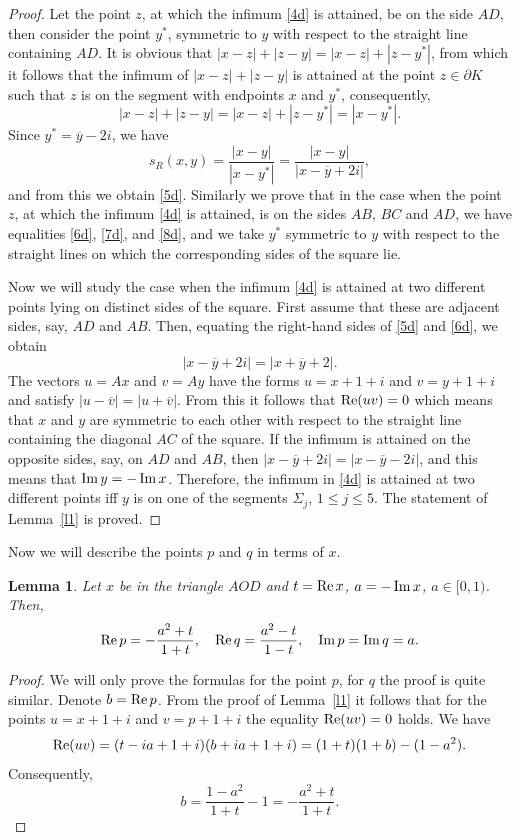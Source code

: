 \documentclass[12pt,a4paper]{amsart}
\newtheorem{lemma}{Lemma}
\def\Re{\mathop{\rm Re}\nolimits}
\def\Im{\mathop{\rm Im}\nolimits}
\begin{document}
\begin{proof}
Let the point $z$, at which the infimum \eqref{4d} is attained, be
on the side $AD$, then consider the point $y^*$, symmetric to $y$
with respect to the straight line containing $AD$. It is obvious
that $|x-z|+|z-y| = |x-z|+|z-y^*|$, from which it follows
that the infimum of $|x-z|+|z-y|$ is attained at the point $z \in
\partial K$ such that  $z$ is on the segment with endpoints $x$  and $y^{*}$, consequently,
$$
|x-z|+|z-y| = |x-z|+|z-y^*|=|x-y^*|.
$$
Since $y^* = \overline{y} - 2i$, we have
$$
\displaystyle s_R(x,y) = \frac{|x-y|}{|x-y^*|}=
\frac{|x-y|}{|x-\overline{y}+2i|},$$ and from this we obtain
\eqref{5d}. Similarly we prove that in the case when the point $z$,
at which the infimum \eqref{4d} is attained, is on the sides $AB$,
$BC$ and $AD$,
 we have equalities \eqref{6d}, \eqref{7d}, and \eqref{8d},
 and we take  $y^*$ symmetric to $y$ with respect to the straight lines on which the corresponding sides of the square lie.

Now we will study the case when the infimum \eqref{4d} is attained
at two different points lying on distinct sides of the square. First
assume that these are adjacent sides, say, $AD$ and $AB$. Then,
equating the right-hand sides of \eqref{5d} and \eqref{6d}, we
obtain $$|x-\overline{y}+2i|=|x+\overline{y}+2|.$$ The vectors
$u=Ax$ and $v=Ay$ have the forms $u=x+1+i$ and $v=y+1+i$ and satisfy
$|u-\overline{v}|=|u+\overline{v}|$. From this it follows that
$\Re(uv)=0$ which means that $x$ and  $y$ are symmetric to each
other with respect to the straight line containing the diagonal $AC$
of the square. If the infimum is attained on the opposite sides,
say, on $AD$ and $AB$, then
$|x-\overline{y}+2i|=|x-\overline{y}-2i|$, and this means
that $\Im y=-\Im x$. Therefore, the infimum in \eqref{4d} is
attained at two different points iff  $y$ is on one of the segments
$\Sigma_j$, $1\le j\le 5$.  The statement of Lemma~\ref{l1} is
proved.
\end{proof}



\medskip

Now we will describe the points $p$ and $q$ in terms of  $x$.

\begin{lemma}\label{pq}
Let $x$ be in the triangle $AOD$ and  $t=\Re x$, $a=-\Im x$, $a\in
[0,1)$. Then,
$$
\Re p= -\frac{a^2+t}{1+t}, \quad \Re q= \frac{a^2-t}{1-t},\quad  \Im p=\Im q=a.
$$
\end{lemma}

\begin{proof}
We will only prove the formulas for the point $p$, for $q$ the proof
is quite similar. Denote $b=\Re p$.  From the proof of
Lemma~\ref{l1} it follows that for the points $u=x+1+i$ and
$v=p+1+i$  the equality $\Re (uv)=0$ holds. We have
$$
\Re(uv)=(t-ia+1+i)(b+ia+1+i)=(1+t)(1+b)-(1-a^2).
$$
Consequently,
$$b=\frac{1-a^2}{1+t}-1=-\frac{a^2+t}{1+t}.$$
\end{proof}
\end{document}
